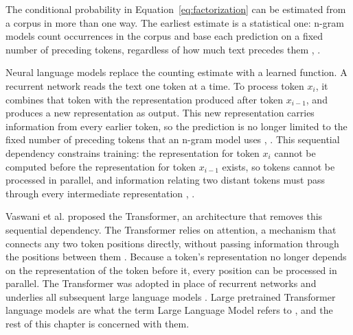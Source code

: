 The conditional probability in Equation~\ref{eq:factorization} can be estimated from a corpus in more than one way. The earliest estimate is a statistical one: n-gram models count occurrences in the corpus and base each prediction on a fixed number of preceding tokens, regardless of how much text precedes them \cite{zhaoSurveyLargeLanguage2026}, \cite[Chap.~24]{russellArtificialIntelligenceModern2022}.

Neural language models replace the counting estimate with a learned function. A recurrent network reads the text one token at a time. To process token $x_i$, it combines that token with the representation produced after token $x_{i-1}$, and produces a new representation as output. This new representation carries information from every earlier token, so the prediction is no longer limited to the fixed number of preceding tokens that an n-gram model uses \cite{zhaoSurveyLargeLanguage2026}, \cite[Chap.~25]{russellArtificialIntelligenceModern2022}. This sequential dependency constrains training: the representation for token $x_i$ cannot be computed before the representation for token $x_{i-1}$ exists, so tokens cannot be processed in parallel, and information relating two distant tokens must pass through every intermediate representation \cite[Chap.~25]{russellArtificialIntelligenceModern2022}, \cite{vaswaniAttentionAllYou2023}.

Vaswani et al. proposed the Transformer, an architecture that removes this sequential dependency. The Transformer relies on attention, a mechanism that connects any two token positions directly, without passing information through the positions between them \cite{vaswaniAttentionAllYou2023}. Because a token's representation no longer depends on the representation of the token before it, every position can be processed in parallel. The Transformer was adopted in place of recurrent networks and underlies all subsequent large language models \cite{zhaoSurveyLargeLanguage2026}. Large pretrained Transformer language models are what the term Large Language Model refers to \cite{zhaoSurveyLargeLanguage2026}, and the rest of this chapter is concerned with them.
